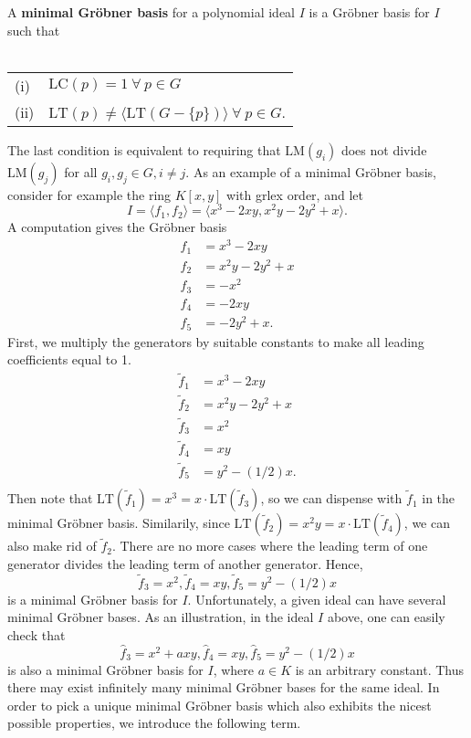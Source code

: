 \documentclass[english,bachelor]{liumaiex}
\begin{document}
\begin{define}
A \textbf{minimal Gröbner basis} for a polynomial ideal $I$ is a Gröbner basis for $I$ such that\\ \\
\begin{tabular}{ll}
(i) & $\textrm{LC}(p)=1 \ \forall \ p\in G$ \\
(ii) &$\textrm{LT}(p)\neq\langle \textrm{LT}(G-\{p\})\rangle \ \forall \ p\in G$.
\end{tabular}
\end{define}
The last condition is equivalent to requiring that $\textrm{LM}(g_i)$ does not divide $\textrm{LM}(g_j)$ for all $g_i, g_j \in G, i\neq j$. As an example of a minimal Gröbner basis, consider for example the ring $K[x,y]$ with grlex order, and let
\begin{displaymath}
I = \langle f_1,f_2\rangle=\langle x^3-2xy,x^2y-2y^2+x\rangle.
\end{displaymath}
A computation gives the Gröbner basis
\begin{align*}
f_1&=x^3-2xy\\
f_2&=x^2y-2y^2+x\\
f_3&=-x^2\\
f_4&=-2xy\\
f_5&=-2y^2+x.
\end{align*}
First, we multiply the generators by suitable constants to make all leading coefficients equal to 1.
\begin{align*}
\tilde{f}_1&=x^3-2xy\\
\tilde{f}_2&=x^2y-2y^2+x\\
\tilde{f}_3&=x^2\\
\tilde{f}_4&=xy\\
\tilde{f}_5&=y^2-(1/2)x.\\
\end{align*}
Then note that $\textrm{LT}(\tilde{f}_1)=x^3=x\cdot\textrm{LT}(\tilde{f}_3)$, so we can dispense with $\tilde{f}_1$ in the minimal Gröbner basis. Similarily, since $\textrm{LT}(\tilde{f}_2)=x^2y=x\cdot\textrm{LT}(\tilde{f}_4)$, we can also make rid of $\tilde{f}_2$. There are no more cases where the leading term of one generator divides the leading term of another generator. Hence,
\begin{displaymath}
\tilde{f}_3=x^2, \tilde{f}_4=xy, \tilde{f}_5=y^2-(1/2)x
\end{displaymath}
is a minimal Gröbner basis for $I$.
Unfortunately, a given ideal can have several minimal Gröbner bases. As an illustration, in the ideal $I$ above, one can easily check that
\begin{displaymath}
\hat{f}_3=x^2+axy, \hat{f}_4=xy, \hat{f}_5=y^2-(1/2)x
\end{displaymath}
is also a minimal Gröbner basis for $I$, where $a\in K$ is an arbitrary constant. Thus there may exist infinitely many minimal Gröbner bases for the same ideal. In order to pick a unique minimal Gröbner basis which also exhibits the nicest possible properties, we introduce the following term.
\end{document}
